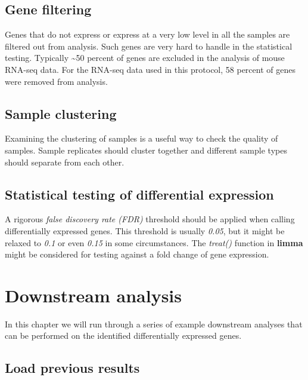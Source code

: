 \documentclass[]{book}
\begin{document}
\hypertarget{gene-filtering}{%
\section{Gene filtering}\label{gene-filtering}}

Genes that do not express or express at a very low level in all the samples are filtered out from analysis. Such genes are very hard to handle in the statistical testing. Typically \textasciitilde{}50 percent of genes are excluded in the analysis of mouse RNA-seq data. For the RNA-seq data used in this protocol, 58 percent of genes were removed from analysis.

\hypertarget{sample-clustering}{%
\section{Sample clustering}\label{sample-clustering}}

Examining the clustering of samples is a useful way to check the quality of samples. Sample
replicates should cluster together and different sample types should separate from each other.

\hypertarget{statistical-testing-of-differential-expression}{%
\section{Statistical testing of differential expression}\label{statistical-testing-of-differential-expression}}

A rigorous \emph{false discovery rate (FDR)} threshold should be applied when calling differentially
expressed genes. This threshold is usually \emph{0.05}, but it might be relaxed to \emph{0.1} or even \emph{0.15} in some circumstances. The \emph{treat()} function in \textbf{limma} might be considered for testing against a fold change of gene expression.

\hypertarget{downstream-analysis}{%
\chapter{Downstream analysis}\label{downstream-analysis}}

In this chapter we will run through a series of example downstream analyses that can be performed on the identified differentially expressed genes.

\hypertarget{load-previous-results}{%
\section{Load previous results}\label{load-previous-results}}
\end{document}
